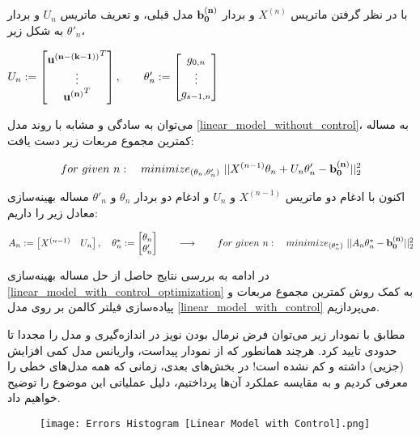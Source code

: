 \documentclass{scribe-cgenomics}
\begin{document}
با در نظر گرفتن ماتریس
$X^{(n)}$
و بردار
$\bold{b^{(n)}_0}$
مدل قبلی، و تعریف ماتریس
$U_{n}$
و بردار
$\theta'_n$
به شکل زیر،

\begin{center}
$
U_{n} := 
\begin{bmatrix}
\bold{u^{(n - (k-1))}}^T \\
\vdots \\
\bold{u^{(n)}}^T \\
\end{bmatrix},
\qquad
\theta'_n :=
\begin{bmatrix}
g_{0,n} \\
\vdots \\
g_{s-1,n}
\end{bmatrix}
$
\end{center}

می‌توان به سادگی و مشابه با روند مدل
\ref{linear_model_without_control}،
به مساله کمترین مجموع مربعات زیر دست یافت:

\begin{equation}\label{linear_model_with_control_optimization}
for\ given\ n:\quad minimize_{(\theta_n, \theta'_n)}\ ||X^{(n-1)}\theta_n + U_{n}\theta'_n - \bold{b^{(n)}_0}||_2^2
\end{equation}

اکنون با ادغام دو ماتریس
$X^{(n-1)}$
و
$U_n$
و ادغام دو بردار
$\theta_n$
و
$\theta'_n$
مساله بهینه‌سازی معادل زیر را داریم:

\begin{center}
$
A_n := 
\begin{bmatrix}
X^{(n-1)} & U_n
\end{bmatrix},
\quad
\theta^*_n :=
\begin{bmatrix}
\theta_n \\
\theta'_n
\end{bmatrix}
\qquad
\longrightarrow
\qquad
for\ given\ n:\quad minimize_{(\theta^*_n)}\ ||A_n\theta^*_n - \bold{b^{(n)}_0}||_2^2
$
\end{center}


در ادامه به بررسی نتایج حاصل از حل مساله بهینه‌سازی
\ref{linear_model_with_control_optimization}
به کمک روش کمترین مجموع مربعات و پیاده‌سازی فیلتر کالمن بر روی مدل
\ref{linear_model_with_control}
می‌پردازیم.

\begin{مشاهده}
مطابق با نمودار زیر می‌توان فرض نرمال بودن نویز در اندازه‌گیری و مدل را مجددا تا حدودی تایید کرد. هرچند همانطور که از نمودار پیداست، واریانس مدل کمی افزایش (جزیی) داشته و کم نشده است! در بخش‌های بعدی، زمانی که همه مدل‌های خطی را معرفی کردیم و به مقایسه عملکرد آن‌ها پرداختیم، دلیل عملیاتی این موضوع را توضیح خواهیم داد.

\begin{figure}[h]
\texttt{[image: Errors Histogram [Linear Model with Control].png]}
\centering
\end{figure}
\end{مشاهده}
\end{document}
